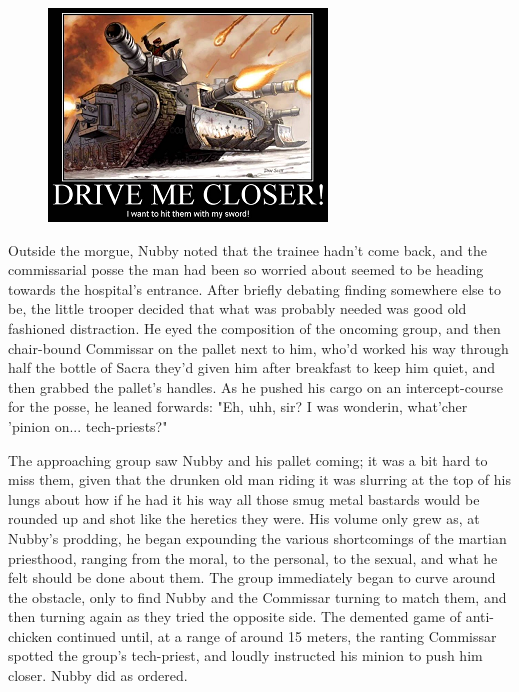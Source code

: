 \begin{figure}
	\begin{center}
		\includegraphics[width=\figwidth]{pics/21/27.png}
	\end{center}
\end{figure}
Outside the morgue, Nubby noted that the trainee hadn't come back, and the commissarial posse the man had been so worried about seemed to be heading towards the hospital's entrance. 
After briefly debating finding somewhere else to be, the little trooper decided that what was probably needed was good old fashioned distraction. 
He eyed the composition of the oncoming group, and then chair-bound Commissar on the pallet next to him, who'd worked his way through half the bottle of Sacra they'd given him after breakfast to keep him quiet, and then grabbed the pallet's handles. 
As he pushed his cargo on an intercept-course for the posse, he leaned forwards: 
"Eh, uhh, sir? 
I was wonderin, what'cher 'pinion on... 
tech-priests?"

The approaching group saw Nubby and his pallet coming; 
it was a bit hard to miss them, given that the drunken old man riding it was slurring at the top of his lungs about how if he had it his way all those smug metal bastards would be rounded up and shot like the heretics they were. 
His volume only grew as, at Nubby's prodding, he began expounding the various shortcomings of the martian priesthood, ranging from the moral, to the personal, to the sexual, and what he felt should be done about them. 
The group immediately began to curve around the obstacle, only to find Nubby and the Commissar turning to match them, and then turning again as they tried the opposite side. 
The demented game of anti-chicken continued until, at a range of around 15 meters, the ranting Commissar spotted the group's tech-priest, and loudly instructed his minion to push him closer. 
Nubby did as ordered.

